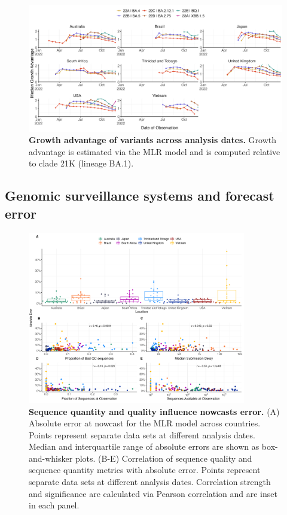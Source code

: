 \documentclass[11pt,oneside,letterpaper]{article}
\begin{document}
\begin{figure}[H]
	\centering
    \includegraphics[width=1.0\textwidth]{figures/ga_estimates.png}
	\caption{
		\textbf{Growth advantage of variants across analysis dates.}
		Growth advantage is estimated via the MLR model and is computed relative to clade 21K (lineage BA.1).
	}
	\label{fig:ga_estimates}
\end{figure}

\subsection*{Genomic surveillance systems and forecast error}

\begin{figure}[tb!]
	\centering
    \includegraphics[width=0.85\textwidth]{figures/Var_of_interest.png}
	\caption{
		\textbf{Sequence quantity and quality influence nowcasts error.}
    (A) Absolute error at nowcast for the MLR model across countries.
		Points represent separate data sets at different analysis dates.
		Median and interquartile range of absolute errors are shown as box-and-whisker plots.
		(B-E) Correlation of sequence quality and sequence quantity metrics with absolute error.
		Points represent separate data sets at different analysis dates.
    Correlation strength and significance are calculated via Pearson correlation and are inset in each panel.
	}
	\label{fig:vars_of_interest}
\end{figure}
\end{document}
